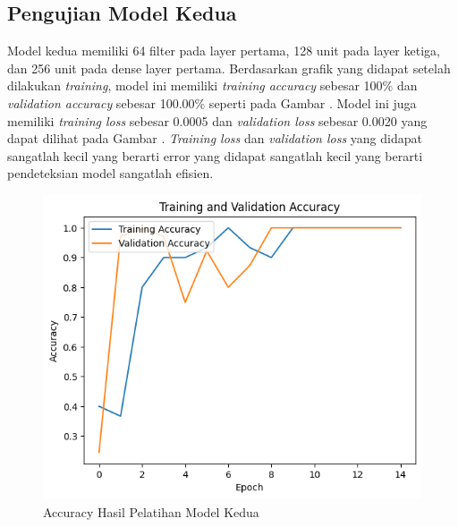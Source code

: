 \subsection{Pengujian Model Kedua}
Model kedua  memiliki 64 filter pada layer pertama, 128 unit pada layer ketiga, dan 256 unit pada dense layer pertama. Berdasarkan grafik yang didapat setelah dilakukan \emph{training}, model ini memiliki \emph{training accuracy} sebesar 100\% dan \emph{validation accuracy} sebesar 100.00\% seperti pada Gambar . Model ini juga memiliki \emph{training loss} sebesar 0.0005 dan \emph{validation loss} sebesar 0.0020 yang dapat dilihat pada Gambar . \emph{Training loss} dan \emph{validation loss} yang didapat sangatlah kecil yang berarti error yang didapat sangatlah kecil yang berarti pendeteksian model sangatlah efisien.

\begin{figure}[H]
  \centering
  \includegraphics[scale=0.7]{gambar/accuracytdk.png}
  \caption{Accuracy Hasil Pelatihan Model Kedua}
  \label{fig:AccuracyHasilPelatihanModelKedua}
\end{figure}

